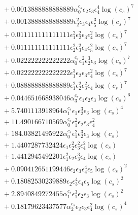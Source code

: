 \documentclass[10pt]{article}
\begin{document}
\begin{align*}
&{}  + 0.0013888888888889 \alpha_{0}^{c_s} \epsilon_{2} \epsilon_{3} \epsilon_{4}^{4} \log{\left(c_{s} \right)}^{7} \\
&{}  + 0.0013888888888889 \epsilon_{2}^{2} \epsilon_{3} \epsilon_{4} \epsilon_{5}^{3} \log{\left(c_{s} \right)}^{7} \\
&{}  + 0.011111111111111 \epsilon_{1}^{2} \epsilon_{2}^{2} \epsilon_{3} \epsilon_{4}^{2} \log{\left(c_{s} \right)}^{7} \\
&{}  + 0.011111111111111 \epsilon_{2}^{2} \epsilon_{3}^{2} \epsilon_{4} \epsilon_{5}^{2} \log{\left(c_{s} \right)}^{7} \\
&{}  + 0.022222222222222 \alpha_{0}^{c_s} \epsilon_{1}^{2} \epsilon_{2}^{3} \epsilon_{3} \log{\left(c_{s} \right)}^{7} \\
&{}  + 0.022222222222222 \epsilon_{1}^{3} \epsilon_{2} \epsilon_{3} \epsilon_{4}^{2} \log{\left(c_{s} \right)}^{7} \\
&{}  + 0.088888888888889 \epsilon_{1}^{2} \epsilon_{2}^{2} \epsilon_{3}^{2} \epsilon_{4} \log{\left(c_{s} \right)}^{7} \\
&{}  + 0.044651668938046 \alpha_{3}^{c_s} \epsilon_{1} \epsilon_{2} \epsilon_{3} \log{\left(c_{s} \right)}^{6} \\
&{}  + 5.7401113918964 \alpha_{1}^{c_s} \epsilon_{1} \epsilon_{2}^{3} \epsilon_{3} \log{\left(c_{s} \right)}^{4} \\
&{}  + 11.490166710569 \alpha_{0}^{c_s} \epsilon_{1}^{2} \epsilon_{2} \epsilon_{3} \epsilon_{4}^{2} \\
&{}  + 184.03821495922 \alpha_{0}^{c_s} \epsilon_{1}^{2} \epsilon_{2}^{3} \epsilon_{3} \log{\left(c_{s} \right)} \\
&{}  + 1.4407287732424 \epsilon_{1} \epsilon_{2}^{2} \epsilon_{3}^{2} \epsilon_{4}^{2} \log{\left(c_{s} \right)} \\
&{}  + 1.4412945492201 \epsilon_{1}^{2} \epsilon_{2} \epsilon_{3}^{3} \epsilon_{4} \log{\left(c_{s} \right)} \\
&{}  + 0.090412651199446 \epsilon_{2} \epsilon_{3} \epsilon_{4}^{4} \epsilon_{5} \log{\left(c_{s} \right)}^{2} \\
&{}  + 0.18082530239889 \epsilon_{2} \epsilon_{3}^{4} \epsilon_{4} \epsilon_{5} \log{\left(c_{s} \right)}^{2} \\
&{}  + 2.8940849272455 \alpha_{1}^{c_s} \epsilon_{1}^{3} \epsilon_{2} \epsilon_{3} \log{\left(c_{s} \right)}^{2} \\
&{}  + 0.18179623437577 \alpha_{2}^{c_s} \epsilon_{2} \epsilon_{3} \epsilon_{4}^{2} \log{\left(c_{s} \right)}^{4} \\

\end{align*}
\end{document}
